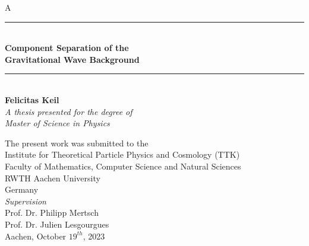 \documentclass[twoside, 11pt, English, openany]{book}
\begin{document}
\begin{titlepage}
    \thispagestyle{fancy}
    \begin{spacing}{1.5}
        \color{white}
        A \\
        \color{black}
    \begin{center}
        \vspace{3cm}
        \noindent\rule{6cm}{0.4pt} \\
       {\LARGE \textbf{ Component Separation of the \\ 
       \vspace{0.5cm}
      Gravitational Wave Background}}
        \noindent\rule{6cm}{0.4pt} \\
        
       \vspace{1cm}
       \large{\textbf{Felicitas Keil}} \\
       \vspace{3cm}        
       \textit{A thesis presented for the degree of\\
       Master of Science in Physics}
            
       \vspace{0.8cm}
       \small{The present work was submitted to the \\
        Institute for Theoretical Particle Physics and Cosmology (TTK)\\
       Faculty of Mathematics, Computer Science and Natural Sciences \\
       RWTH Aachen University\\
       Germany\\
       }
       \vspace{3cm}
       \textit{Supervision} \\
       \large{Prof. Dr. Philipp Mertsch \\
       Prof. Dr. Julien Lesgourgues \\
       }
       \vspace{1cm}
       \small{Aachen, October $19^{th}$, 2023}
       \vspace{-2cm}
    \end{center}
    \end{spacing}
\end{titlepage}
\end{document}
